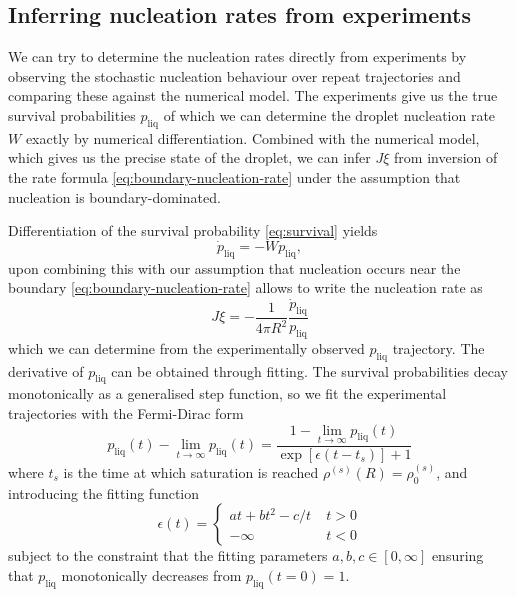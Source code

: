 \documentclass[11pt,twoside]{report}
\begin{document}
\subsection{Inferring nucleation rates from experiments}

We can try to determine the nucleation rates directly from experiments by observing the stochastic nucleation behaviour over repeat trajectories and comparing these against the numerical model.
The experiments give us the true survival probabilities $p_\mathrm{liq}$ of which we can determine the droplet nucleation rate $W$ exactly by numerical differentiation.
Combined with the numerical model, which gives us the precise state of the droplet, we can infer $J\xi$ from inversion of the rate formula \eqref{eq:boundary-nucleation-rate} under the assumption that nucleation is boundary-dominated.

Differentiation of the survival probability \eqref{eq:survival} yields
\begin{equation}
  \dot{p}_\mathrm{liq}
  =
  - W p_\mathrm{liq},
\end{equation}
upon combining this with our assumption that nucleation occurs near the boundary \eqref{eq:boundary-nucleation-rate} allows to write the nucleation rate as
\begin{equation}
  J\xi
  =
  - \frac{1}{4\pi R^2} \frac{\dot{p}_\mathrm{liq}}{p_\mathrm{liq}}
\end{equation}
which we can determine from the experimentally observed $p_\mathrm{liq}$ trajectory.
The derivative of $p_\mathrm{liq}$ can be obtained through fitting.
The survival probabilities decay monotonically as a generalised step function, so we fit the experimental trajectories with the Fermi-Dirac form
\begin{equation}
  p_\mathrm{liq}(t) - \lim_{t \to \infty} p_\mathrm{liq}(t)
  =
  \frac{1 - \lim_{t \to \infty} p_\mathrm{liq}(t)}{\exp{\left[\epsilon(t - t_s)\right]} + 1}
\end{equation}
where $t_s$ is the time at which saturation is reached $\rho^{(s)}(R) = \rho^{(s)}_0$, and introducing the fitting function
\begin{equation*}
  \epsilon(t)
  =
  \begin{cases}
    at + bt^2 - c / t & \; t > 0 \\
    - \infty & \; t < 0
  \end{cases}
\end{equation*}
subject to the constraint that the fitting parameters $a, b, c \in [0, \infty]$ ensuring that $p_\mathrm{liq}$ monotonically decreases from $p_\mathrm{liq}(t=0)=1$.
\end{document}
